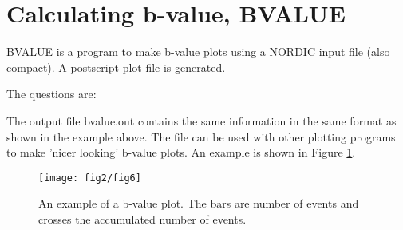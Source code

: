 
\section{Calculating b-value, BVALUE}


BVALUE is a program to make b-value plots using a NORDIC input file (also compact). A postscript plot file is generated. 

The questions are: 



The output file bvalue.out contains the same information in the same format as shown in the example above. The file can be used with other plotting programs to make 'nicer looking' b-value plots. An example is shown in Figure \ref{fig:b-value}. 

\begin{figure}
\centerline{\texttt{[image: fig2/fig6]}}
\caption{
An example of a b-value plot. The bars are number of events and crosses the accumulated number of events. 
}
\label{fig:b-value}
\end{figure}


